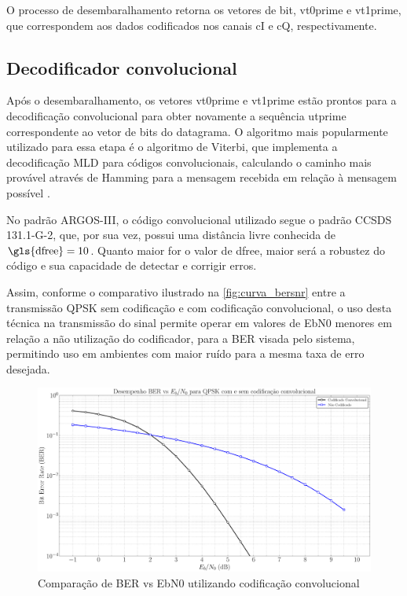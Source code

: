 O processo de desembaralhamento retorna os vetores de bit, \gls{vt0prime} e \gls{vt1prime}, que correspondem aos dados codificados nos canais \gls{cI} e \gls{cQ}, respectivamente.

\subsection{Decodificador convolucional}

Após o desembaralhamento, os vetores \gls{vt0prime} e \gls{vt1prime} estão prontos para a decodificação convolucional para obter novamente a sequência \gls{utprime} correspondente ao vetor de bits do datagrama. O algoritmo mais popularmente utilizado para essa etapa é o algoritmo de Viterbi, que implementa a decodificação \gls{MLD} para códigos convolucionais, calculando o caminho mais provável através de \gls{Hamming} para a mensagem recebida em relação à mensagem possível \cite{cnes_services_and_message_formats_ed2_rev2_2006, rodrigues_demodulador_2018}.

No padrão \gls{ARGOS-III}, o código convolucional utilizado segue o padrão \gls{CCSDS} 131.1-G-2, que, por sua vez, possui uma distância livre conhecida de $\text{\gls{dfree}} = 10$. Quanto maior for o valor de \gls{dfree}, maior será a robustez do código e sua capacidade de detectar e corrigir erros.

\noindent Assim, conforme o comparativo ilustrado na \autoref{fig:curva_bersnr} entre a transmissão \gls{QPSK} sem codificação e com codificação convolucional, o uso desta técnica na transmissão do sinal permite operar em valores de \gls{EbN0} menores em relação a não utilização do codificador, para a \gls{BER} visada pelo sistema, permitindo uso em ambientes com maior ruído para a mesma taxa de erro desejada.

\begin{figure}[H]
	\centering
	\caption{Comparação de BER vs \gls{EbN0} utilizando codificação convolucional}\label{fig:curva_bersnr}
	\includegraphics[width=\linewidth]{assets/cap2/bersnr.pdf}
\end{figure}
